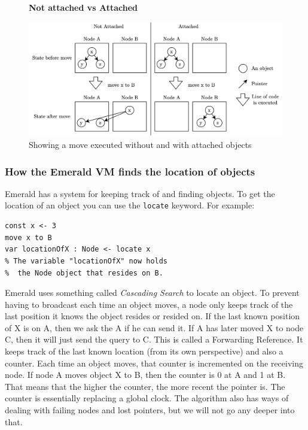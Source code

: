 \begin{figure}[t]
    \centering
    \textbf{Not attached vs Attached}\par\medskip
    \includegraphics[scale=0.8]{chapters/2_background/figures/emerald_attached.png}
    \caption{Showing a move executed without and with attached objects}
    \label{fig:emerald_attached_figure}
\end{figure}



\subsubsection{How the Emerald VM finds the location of objects}\label{cascading_search}
Emerald has a system for keeping track of and finding objects. To get the location of an object you can use the \verb|locate| keyword. For example:
\begin{lstlisting}[language=emerald]
const x <- 3
move x to B
var locationOfX : Node <- locate x
% The variable "locationOfX" now holds 
%  the Node object that resides on B.
\end{lstlisting}
Emerald uses something called \textit{Cascading Search} to locate an object. To prevent having to broadcast each time an object moves, a node only keeps track of the last position it knows the object resides or resided on. If the last known position of X is on A, then we ask the A if he can send it. If A has later moved X to node C, then it will just send the query to C. This is called a Forwarding Reference. It keeps track of the last known location (from its own perspective) and also a counter. Each time an object moves, that counter is incremented on the receiving node. If node A moves object X to B, then the counter is 0 at A and 1 at B. That means that the higher the counter, the more recent the pointer is. The counter is essentially replacing a global clock. The algorithm also has ways of dealing with failing nodes and lost pointers, but we will not go any deeper into that. 


